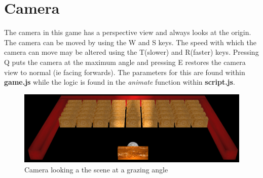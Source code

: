 \chapter{Camera}
The camera in this game has a perspective view and always looks at the origin. The camera can be moved by using the W and S keys. The speed with which the camera can move may be altered using the T(slower) and R(faster) keys. Pressing Q puts the camera at the maximum angle and pressing E restores the camera view to normal (ie facing forwards). The parameters for this are found within \textbf{game.js} while the logic is found in the \textit{animate} function within \textbf{script.js}.

\begin{figure}[H]
	\centering
	\includegraphics[width=\textwidth]{Images/Grazing.png}
	\caption{Camera looking a the scene at a grazing angle}
\end{figure}